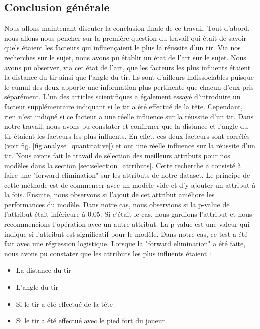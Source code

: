 \documentclass[12pt]{article}
\begin{document}
\subsection{Conclusion générale}
Nous allons maintenant discuter la conclusion finale de ce travail.
Tout d'abord, nous allons nous pencher sur la première question du travail qui était de savoir quels étaient les facteurs qui influençaient le plus la réussite d'un tir.
Via nos recherches sur le sujet, nous avons pu établir un état de l'art sur le sujet.
Nous avons pu observer, via cet état de l'art, que les facteurs les plus influents étaient la distance du tir ainsi que l'angle du tir.
Ils sont d'ailleurs indissociables puisque le cumul des deux apporte une information plus pertinente que chacun d'eux pris séparément.
L'un des articles scientifiques a également essayé d'introduire un facteur supplémentaire indiquant si le tir a été effectué de la tête.
Cependant, rien n'est indiqué si ce facteur a une réelle influence sur la réussite d'un tir.
\newline\newline
Dans notre travail, nous avons pu constater et confirmer que la distance et l'angle du tir étaient les facteurs les plus influents.
En effet, ces deux facteurs sont corrélés (voir fig. \ref{fig:analyse_quantitative}) et ont une réelle influence sur la réussite d'un tir.
Nous avons fait le travail de sélection des meilleurs attributs pour nos modèles dans la section \ref{sec:selection_attributs}.
Cette recherche a consisté à faire une "forward elimination" sur les attributs de notre dataset.
Le principe de cette méthode est de commencer avec un modèle vide et d'y ajouter un attribut à la fois.
Ensuite, nous observons si l'ajout de cet attribut améliore les performances du modèle.
Dans notre cas, nous observions si la p-value de l'attribut était inférieure à 0.05.
Si c'était le cas, nous gardions l'attribut et nous recommencions l'opération avec un autre attribut.
La p-value est une valeur qui indique si l'attribut est significatif pour le modèle.
Dans notre cas, ce test a été fait avec une régression logistique.
Lorsque la "forward elimination" a été faite, nous avons pu constater que les attributs les plus influents étaient :
\begin{itemize}
    \item La distance du tir
    \item L'angle du tir
    \item Si le tir a été effectué de la tête
    \item Si le tir a été effectué avec le pied fort du joueur
\end{itemize}
\end{document}
